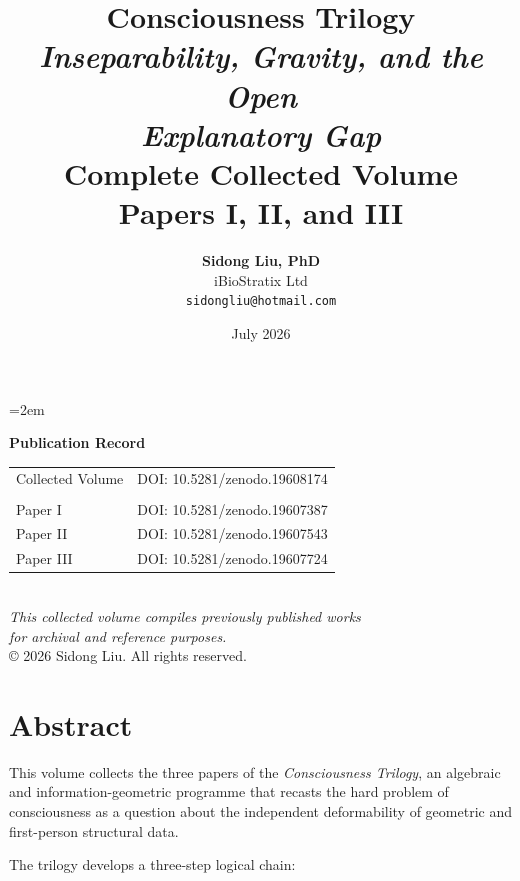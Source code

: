 \documentclass[12pt,a4paper,openany]{book}
\title{
  \vspace{-2cm}
  {\Huge\textbf{Consciousness Trilogy}}\\[1cm]
  {\Large\textit{Inseparability, Gravity, and the Open\\
  Explanatory Gap}}\\[2cm]
  {\large Complete Collected Volume}\\[0.5cm]
  {\normalsize Papers I, II, and III}
}
\author{
  \textbf{Sidong Liu, PhD}\\[0.5em]
  iBioStratix Ltd\\[0.3em]
  \texttt{sidongliu@hotmail.com}
}
\date{July 2026}
\begin{document}
\emergencystretch=2em
\raggedbottom
{}

\frontmatter
\maketitle

\newpage
\thispagestyle{empty}
\vspace*{\fill}
\begin{center}
\textbf{Publication Record}\\[2em]
\begin{tabular}{ll}
Collected Volume & DOI: 10.5281/zenodo.19608174 \\
\\[-0.2em]
Paper I & DOI: 10.5281/zenodo.19607387 \\
Paper II & DOI: 10.5281/zenodo.19607543 \\
Paper III & DOI: 10.5281/zenodo.19607724 \\
\end{tabular}
\\[3em]
\textit{This collected volume compiles previously published works\\
for archival and reference purposes.}
\\[2em]
\copyright{} 2026 Sidong Liu. All rights reserved.
\end{center}
\vspace*{\fill}

\chapter*{Abstract}

This volume collects the three papers of the \emph{Consciousness Trilogy},
an algebraic and information-geometric programme that recasts the hard
problem of consciousness as a question about the independent deformability
of geometric and first-person structural data.

The trilogy develops a three-step logical chain:
\end{document}
